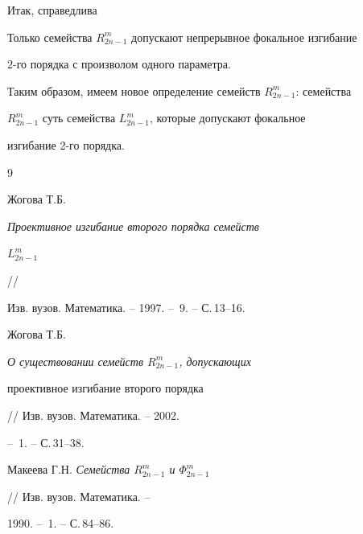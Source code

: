  


Итак, справедлива 


 


\begin{thm} 


Только семейства $R^m_{2n-1}$ допускают непрерывное фокальное изгибание 


$2$-го порядка с произволом одного параметра. 


\end{thm} 


 


Таким образом, имеем новое определение семейств $R^m_{2n-1}$: семейства 


$R^m_{2n-1}$ суть семейства $L^m_{2n-1}$, которые допускают фокальное 


изгибание 2-го порядка. 


 


 


\begin{thebibliography}{9} 


 




Жогова Т.Б. {\em Проективное изгибание второго порядка семейств


$L^m_{2n-1}$} // 


Изв. вузов. Математика. -- 1997. -- \No\,9. -- С.\,13--16. 




Жогова Т.Б. {\em О существовании семейств $R^m_{2n-1}$, допускающих


проективное изгибание второго порядка} // Изв. вузов. Математика. -- 2002.


-- \No\,1. -- С.\,31--38. 




Макеева Г.Н. {\em Семейства $R^m_{2n-1}$ и $\Phi^m_{2n-1}$}


// Изв. вузов. Математика. -- 


1990. -- \No\,1. -- С.\,84--86. 


 


\end{thebibliography} 


 


\vskip 2cm 


 






 


\label{end} 


 


